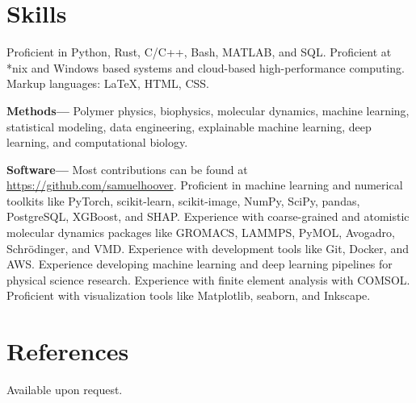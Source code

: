 \documentclass[margin,line]{res}
\begin{document}
\begin{resume}
\begin{itemize}
	\end{itemize}

	\section{\sc Skills}
	Proficient in Python, Rust, C/C++, Bash, MATLAB, and SQL. Proficient at *nix and
	Windows based systems and cloud-based high-performance computing. Markup
	languages: \LaTeX, HTML, CSS.


		{\bf Methods---}%
	Polymer physics, biophysics, molecular dynamics, machine learning,
	statistical modeling, data engineering, explainable machine learning, deep
	learning, and computational biology.


		{\bf Software---}%
	Most contributions can be found at \url{https://github.com/samuelhoover}.
	Proficient in machine learning and numerical toolkits like PyTorch,
	scikit-learn, scikit-image, NumPy, SciPy, pandas, PostgreSQL, XGBoost, and SHAP.
	Experience with coarse-grained and atomistic molecular dynamics packages like
	GROMACS, LAMMPS, PyMOL, Avogadro, Schr\"odinger, and VMD.
	Experience with development tools like Git, Docker, and AWS.
	Experience developing machine learning and deep learning pipelines for
	physical science research.
	Experience with finite element analysis with COMSOL.
	Proficient with visualization tools like Matplotlib, seaborn, and Inkscape.


	\ifx\nopubs\undefined
		
	\else
	\fi

	


	\section{\sc References}
	\parbox{\textwidth}{%
		Available upon request.
	}

\end{resume}
\end{document}
